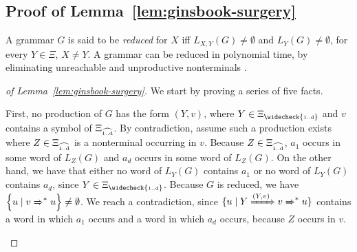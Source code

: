 \documentclass[final]{llncs}
\def\set#1{{\left\{ #1 \right\}}}
\def\Vars{\ensuremath{\Xi}}
\def\Varsi{\ensuremath{\Xi_{\widecheck{\text{\tiny 1..d}}}}}
\def\Varse{\ensuremath{\Xi_{\widehat{\text{\tiny 1..d}}}}}
\begin{document}
\subsection{Proof of Lemma~\ref{lem:ginsbook-surgery}}

A grammar \(G\) is said to be \emph{reduced}
for \(X\) if{}f $L_{X,Y}(G) \neq \emptyset$
and \(L_{Y}(G)\neq \emptyset\), for every \(Y \in \Vars\), \(X\neq
Y\). A grammar can be reduced in polynomial time, by eliminating
unreachable and unproductive
nonterminals \cite[Lemma~1.4.4]{ginsburg}.

\begin{proof}[of Lemma~\ref{lem:ginsbook-surgery}]
We start by proving a series of five facts.  
\begin{compactenum}
\item\label{item:easyfact1} First, no production of \(G\) has the form
  \( (Y,v) \), where \(Y\in\Varsi\) and \(v\) contains a symbol of
  \(\Varse\).  By contradiction, assume such a production exists where
  \(Z \in \Varse\) is a nonterminal occurring in \(v\).  Because \(Z
  \in \Varse\), \(a_1\) occurs in some word of \(L_{Z}(G)\) and
  \(a_d\) occurs in some word of \(L_Z(G)\).  On the other hand, we
  have that either no word of \(L_{Y}(G)\) contains \(a_1\) or no
  word of \(L_{Y}(G)\) contains \(a_d\), since \(Y\in\Varsi\). Because
  \(G\) is reduced, we have \( \set{u \mid v
    \xRightarrow{}^* u} \neq \emptyset \). We reach a contradiction,
  since \( \{u \mid Y \xRightarrow{(Y,v)} v \xRightarrow{}^* u\} \)
  contains a word in which \(a_1\) occurs and a word in which \(a_d\)
  occurs, because \(Z\) occurs in \(v\).


\end{compactenum}
\end{proof}
\end{document}
